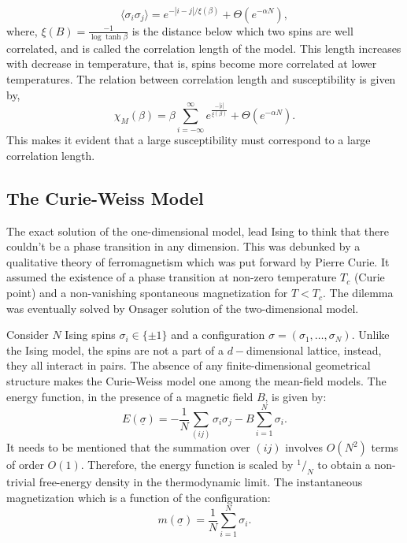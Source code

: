 \documentclass[letterpaper,english,12pt]{article}
\begin{document}
\begin{defn}
\begin{defn}[Susceptibility]
$$\langle \sigma_{i}\sigma_{j}\rangle = e^{-|i-j|/\xi(\beta)}+ \Theta (e^{-\alpha N}),$$
where, $\xi(B) = \frac{-1}{\log \tanh \beta}$ is the distance below which two spins are well correlated, and is called the correlation length of the model. This length increases with decrease in temperature, that is, spins become more correlated at lower temperatures. The relation between correlation length and susceptibility is given by,
\begin{equation}
\chi_{M}(\beta)=\beta \sum_{i=-\infty}^{\infty}e^{\frac{-|i|}{\xi(\beta)}}+\Theta(e^{-\alpha N}).
\end{equation}
This makes it evident that a large susceptibility must correspond to a large correlation length. 
	\end{defn}
\end{defn}
\subsection{The Curie-Weiss Model}

The exact solution of the one-dimensional model, lead Ising to think that there couldn’t be a phase transition in any dimension. This was debunked by a qualitative theory of ferromagnetism which was put forward by Pierre Curie. It assumed the existence of a phase transition at non-zero temperature $T_{c}$ (Curie point) and a non-vanishing spontaneous magnetization for $T<T_{c}$. The dilemma was eventually solved by Onsager solution of the two-dimensional model. 

Consider $N$ Ising spins $\sigma_{i}\in \{\pm 1\}$ and a configuration $\sigma = (\sigma_{1},\hdots,\sigma_{N})$. Unlike the Ising model, the spins are not a part of a $d-$dimensional lattice, instead, they all interact in pairs. The absence of any finite-dimensional geometrical structure makes the Curie-Weiss model one among the mean-field models. The energy function, in the presence of a magnetic field $B$, is given by:
$$E(\underline{\sigma}) = -\frac{1}{N}\sum_{(ij)}\sigma_{i}\sigma_{j}-B\sum_{i=1}^{N}\sigma_{i}.$$ 
It needs to be mentioned that the summation over $(ij)$ involves $O(N^{2})$ terms of order $O(1)$. Therefore, the energy function is scaled by $^1/_N$ to obtain a non-trivial free-energy density in the thermodynamic limit. The instantaneous magnetization which is a function of the configuration:
$$m(\underline{\sigma}) = \frac{1}{N}\sum_{i=1}^{N}\sigma_{i}.$$
\end{document}
